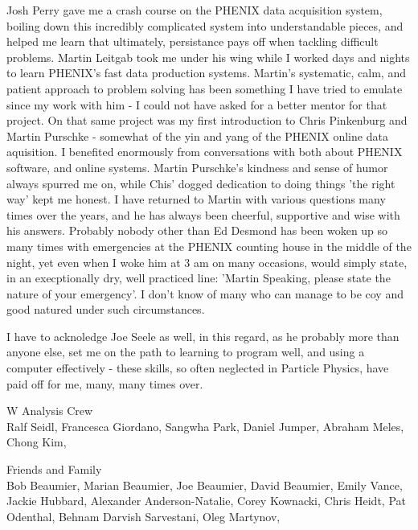 Josh Perry gave me a crash course on the PHENIX data acquisition system,
boiling down this incredibly complicated system into understandable pieces, and
helped me learn that ultimately, persistance pays off when tackling difficult
problems. Martin Leitgab took me under his wing while I worked days and nights
to learn PHENIX's fast data production systems. Martin's systematic, calm, and
patient approach to problem solving has been something I have tried to emulate
since my work with him - I could not have asked for a better mentor for that
project. On that same project was my first introduction to Chris Pinkenburg and
Martin Purschke - somewhat of the yin and yang of the PHENIX online data
aquisition. I benefited enormously from conversations with both about PHENIX
software, and online systems. Martin Purschke's kindness and sense of humor
always spurred me on, while Chis' dogged dedication to doing things 'the right
way' kept me honest. I have returned to Martin with various questions many
times over the years, and he has always been cheerful, supportive and wise with
his answers. Probably nobody other than Ed Desmond has been woken up so many
times with emergencies at the PHENIX counting house in the middle of the night,
yet even when I woke him at 3 am on many occasions, would simply state, in an
execptionally dry, well practiced line: 'Martin Speaking, please state the
nature of your emergency'. I don't know of many who can manage to be coy and
good natured under such circumstances.

I have to acknoledge Joe Seele as well, in this regard, as he probably more
than anyone else, set me on the path to learning to program well, and using a
computer effectively - these skills, so often neglected in Particle Physics,
have paid off for me, many, many times over.

W Analysis Crew \\
  Ralf Seidl, 
  Francesca Giordano, 
  Sangwha Park, 
  Daniel Jumper, 
  Abraham Meles,
  Chong Kim, 

Friends and Family \\
  Bob Beaumier, 
  Marian Beaumier, 
  Joe Beaumier, 
  David Beaumier, 
  Emily Vance, 
  Jackie Hubbard, 
  Alexander Anderson-Natalie, 
  Corey Kownacki, 
  Chris Heidt, 
  Pat Odenthal, 
  Behnam Darvish Sarvestani, 
  Oleg Martynov, 
